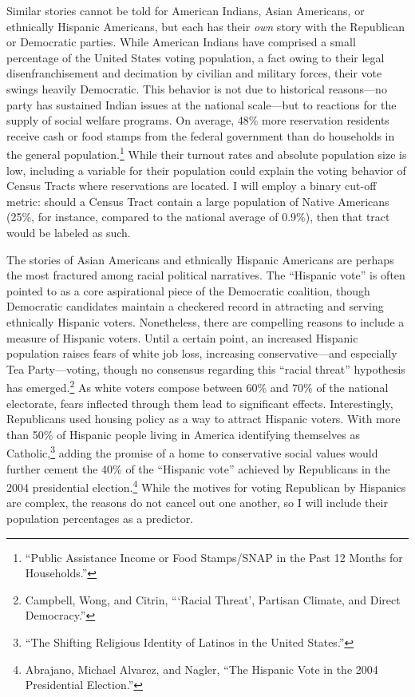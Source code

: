 \documentclass[
]{article}
\begin{document}
Similar stories cannot be told for American Indians, Asian Americans, or ethnically Hispanic Americans, but each has their \emph{own} story with the Republican or Democratic parties.
While American Indians have comprised a small percentage of the United States voting population, a fact owing to their legal disenfranchisement and decimation by civilian and military forces, their vote swings heavily Democratic.
This behavior is not due to historical reasons---no party has sustained Indian issues at the national scale---but to reactions for the supply of social welfare programs.
On average, 48\% more reservation residents receive cash or food stamps from the federal government than do households in the general population.\footnote{``Public Assistance Income or Food Stamps/SNAP in the Past 12 Months for Households.''}
While their turnout rates and absolute population size is low, including a variable for their population could explain the voting behavior of Census Tracts where reservations are located.
I will employ a binary cut-off metric: should a Census Tract contain a large population of Native Americans (25\%, for instance, compared to the national average of 0.9\%), then that tract would be labeled as such.

The stories of Asian Americans and ethnically Hispanic Americans are perhaps the most fractured among racial political narratives.
The ``Hispanic vote'' is often pointed to as a core aspirational piece of the Democratic coalition, though Democratic candidates maintain a checkered record in attracting and serving ethnically Hispanic voters.
Nonetheless, there are compelling reasons to include a measure of Hispanic voters.
Until a certain point, an increased Hispanic population raises fears of white job loss, increasing conservative---and especially Tea Party---voting, though no consensus regarding this ``racial threat'' hypothesis has emerged.\footnote{Campbell, Wong, and Citrin, ```Racial Threat', Partisan Climate, and Direct Democracy.''}
As white voters compose between 60\% and 70\% of the national electorate, fears inflected through them lead to significant effects.
Interestingly, Republicans used housing policy as a way to attract Hispanic voters.
With more than 50\% of Hispanic people living in America identifying themselves as Catholic,\footnote{``The Shifting Religious Identity of Latinos in the United States.''} adding the promise of a home to conservative social values would further cement the 40\% of the ``Hispanic vote'' achieved by Republicans in the 2004 presidential election.\footnote{Abrajano, Michael Alvarez, and Nagler, ``The Hispanic Vote in the 2004 Presidential Election.''}
While the motives for voting Republican by Hispanics are complex, the reasons do not cancel out one another, so I will include their population percentages as a predictor.
\end{document}
